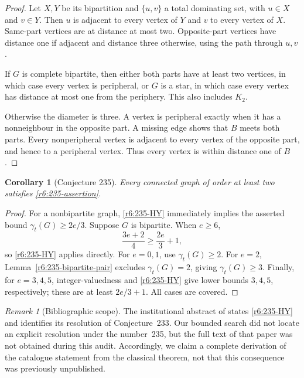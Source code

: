 \documentclass[11pt,a4paper]{article}
\newtheorem{corollary}[theorem]{Corollary}
\theoremstyle{remark}
\newtheorem{remark}[theorem]{Remark}
\begin{document}
\begin{proof}
Let $X,Y$ be its bipartition and $\{u,v\}$ a total dominating set, with
$u\in X$ and $v\in Y$.  Then $u$ is adjacent to every vertex of $Y$ and
$v$ to every vertex of $X$.  Same-part vertices are at distance at most
two.  Opposite-part vertices have distance one if adjacent and distance
three otherwise, using the path through $u,v$.

If $G$ is complete bipartite, then either both parts have at least two
vertices, in which case every vertex is peripheral, or $G$ is a star,
in which case every vertex has distance at most one from the periphery.
This also includes $K_2$.

Otherwise the diameter is three.  A vertex is peripheral exactly when
it has a nonneighbour in the opposite part.  A missing edge shows that
$B$ meets both parts.  Every nonperipheral vertex is adjacent to every
vertex of the opposite part, and hence to a peripheral vertex.  Thus
every vertex is within distance one of $B$.
\end{proof}

\begin{corollary}[Conjecture 235]
\label{r6:235-corollary}
Every connected graph of order at least two satisfies
\eqref{r6:235-assertion}.
\end{corollary}

\begin{proof}
For a nonbipartite graph, \eqref{r6:235-HY} immediately implies the
asserted bound $\gamma_t(G)\ge2e/3$.
Suppose $G$ is bipartite.  When $e\ge6$,
\[
 \frac{3e+2}{4}\ge\frac{2e}{3}+1,
\]
so \eqref{r6:235-HY} applies directly.  For $e=0,1$, use
$\gamma_t(G)\ge2$.  For $e=2$, Lemma~\ref{r6:235-bipartite-pair}
excludes $\gamma_t(G)=2$, giving $\gamma_t(G)\ge3$.
Finally, for $e=3,4,5$, integer-valuedness and
\eqref{r6:235-HY} give lower bounds $3,4,5$, respectively; these are
at least $2e/3+1$.  All cases are covered.
\end{proof}

\begin{remark}[Bibliographic scope]
\label{r6:235-priority}
The institutional abstract of \cite{HY14} states
\eqref{r6:235-HY} and identifies its resolution of Conjecture~233.
Our bounded search did not locate an explicit resolution under the
number~235, but the full text of that paper was not obtained during this
audit.  Accordingly, we claim a complete derivation of the catalogue
statement from the classical theorem, not that this consequence was
previously unpublished.
\end{remark}
\end{document}
